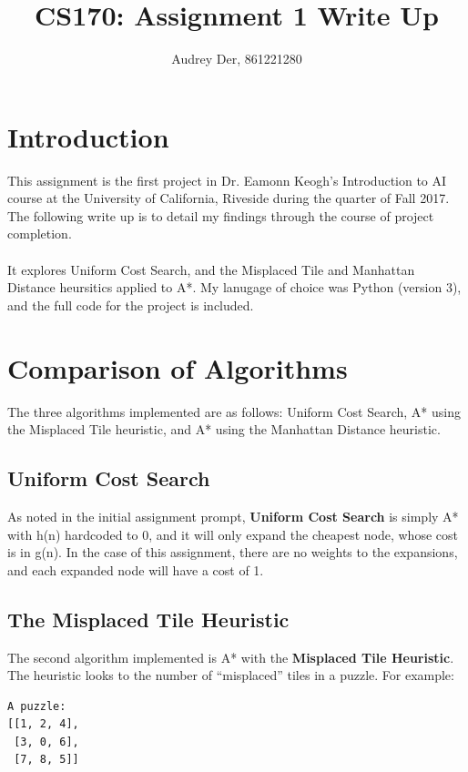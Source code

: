 \documentclass[a4paper]{article}
\title{CS170: Assignment 1 Write Up}
\author{Audrey Der, 861221280}
\begin{document}
\maketitle


\section{Introduction}

This assignment is the first project in Dr. Eamonn Keogh's Introduction to AI
course at the University of California, Riveside during the quarter of Fall
2017. The following write up is to detail my findings through the course of
project completion. \\ \\ It explores Uniform Cost Search, and the Misplaced Tile and
Manhattan Distance heursitics applied to A*. My lanugage of choice was Python
(version 3), and the full code for the project is included.

\section{Comparison of Algorithms}
The three algorithms implemented are as follows: Uniform Cost Search, A* using
the Misplaced Tile heuristic, and A* using the Manhattan Distance heuristic.

\subsection{Uniform Cost Search}
As noted in the initial assignment prompt, \textbf{Uniform Cost Search} is simply A* with
h(n) hardcoded to 0, and it will only expand the cheapest node, whose cost is in
g(n). In the case of this assignment, there are no weights to the expansions,
and each expanded node will have a cost of 1.

\subsection{The Misplaced Tile Heuristic}
The second algorithm implemented is A* with the \textbf{Misplaced Tile Heuristic}. The
heuristic looks to the number of ``misplaced'' tiles in a puzzle. For example:
\begin{verbatim}
A puzzle:
[[1, 2, 4],
 [3, 0, 6],
 [7, 8, 5]]
\end{verbatim}
\end{document}
